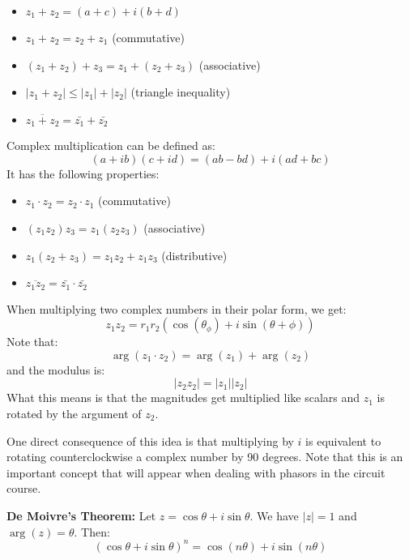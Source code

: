 \documentclass{article}
\let\oldtextbf\textbf
\renewcommand{\textbf}[1]{\oldtextbf{#1}\index{#1}}
\begin{document}
    \begin{itemize}
        \item $z_1+z_2 = (a+c) + i(b+d)$
        \item $z_1+z_2 = z_2+z_1$ (commutative)
        \item $(z_1+z_2)+z_3=z_1+(z_2+z_3)$ (associative)
        \item $|z_1+z_2| \le |z_1| + |z_2|$ (triangle inequality)
        \item $\overline{z_1+z_2} = \bar{z_1}+\bar{z_2}$
    \end{itemize}
Complex multiplication can be defined as:
    \begin{equation}
        (a+ib)(c+id) = (ab-bd)+i(ad+bc)
        \label{eq:}
    \end{equation}
    It has the following properties:
    \begin{itemize}
        \item $z_1 \cdot z_2 = z_2 \cdot z_1$ (commutative)
        \item $(z_1 z_2) z_3 = z_1(z_2z_3)$ (associative)
        \item $z_1(z_2+z_3) = z_1z_2+z_1z_3$ (distributive)
        \item $\overline{z_1z_2} = \bar{z_1} \cdot \bar{z_2}$
    \end{itemize}
    \begin{idea}
        When multiplying two complex numbers in their polar form, we get:
        \begin{equation}
            z_1z_2 = r_1r_2\left(\cos(\theta_\phi)+i\sin(\theta+\phi)\right)
            \label{eq:}
        \end{equation}
        Note that:
        \begin{equation}
            \arg(z_1 \cdot z_2) = \arg(z_1) + \arg(z_2)
            \label{eq:}
        \end{equation}
        and the modulus is:
        \begin{equation}
            |z_2z_2| = |z_1||z_2|
            \label{eq:}
        \end{equation}
        What this means is that the magnitudes get multiplied like scalars and $z_1$ is rotated by the argument of $z_2$.
    \end{idea}
One direct consequence of this idea is that multiplying by $i$ is equivalent to rotating counterclockwise a complex number by 90 degrees. Note that this is an important concept that will appear when dealing with phasors in the circuit course.
    \begin{theorem}
        \textbf{De Moivre's Theorem:} Let $z=\cos\theta+i\sin\theta$. We have $|z|=1$ and $\arg(z)=\theta$. Then:
        \begin{equation}
            (\cos\theta+i\sin\theta)^n = \cos(n\theta)+i\sin(n\theta)
        \end{equation}
    \end{theorem}
\end{document}
